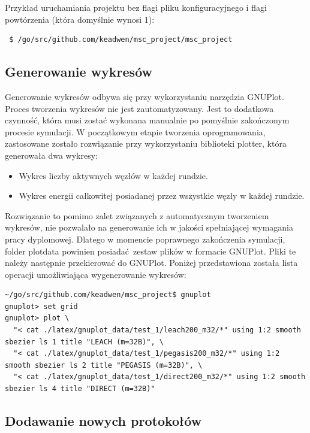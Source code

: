 \documentclass[a4paper,12pt,twoside,openany]{report}
\begin{document}
Przykład uruchamiania projektu bez flagi pliku konfiguracyjnego i flagi powtórzenia (która domyślnie wynosi 1):

\begin{lstlisting}
 $ /go/src/github.com/keadwen/msc_project/msc_project
\end{lstlisting}

\subsection{Generowanie wykresów}

Generowanie wykresów odbywa się przy wykorzystaniu narzędzia GNUPlot. Proces tworzenia wykresów nie jest zautomatyzowany.
Jest to dodatkowa czynność, która musi zostać wykonana manualnie po pomyślnie zakończonym procesie symulacji.
W początkowym etapie tworzenia oprogramowania, zastosowane zostało rozwiązanie przy wykorzystaniu biblioteki plotter, która
generowała dwa wykresy:

\begin{itemize}
 \item Wykres liczby aktywnych węzłów w każdej rundzie.
 \item Wykres energii całkowitej posiadanej przez wszystkie węzły w każdej rundzie.
\end{itemize}

Rozwiązanie to pomimo zalet związanych z automatycznym tworzeniem wykresów, nie pozwalało na generowanie ich w jakości spełniającej
wymagania pracy dyplomowej. Dlatego w momencie poprawnego zakończenia symulacji, folder plotdata powinien posiadać zestaw plików w formacie GNUPlot.
Pliki te należy następnie przekierować do GNUPlot. Poniżej przedstawiona została lista operacji umożliwiająca wygenerowanie wykresów:

\begin{lstlisting}
~/go/src/github.com/keadwen/msc_project$ gnuplot
gnuplot> set grid
gnuplot> plot \
  "< cat ./latex/gnuplot_data/test_1/leach200_m32/*" using 1:2 smooth sbezier ls 1 title "LEACH (m=32B)", \
  "< cat ./latex/gnuplot_data/test_1/pegasis200_m32/*" using 1:2 smooth sbezier ls 2 title "PEGASIS (m=32B)", \
  "< cat ./latex/gnuplot_data/test_1/direct200_m32/*" using 1:2 smooth sbezier ls 4 title "DIRECT (m=32B)"
\end{lstlisting}

\subsection{Dodawanie nowych protokołów}
\end{document}
